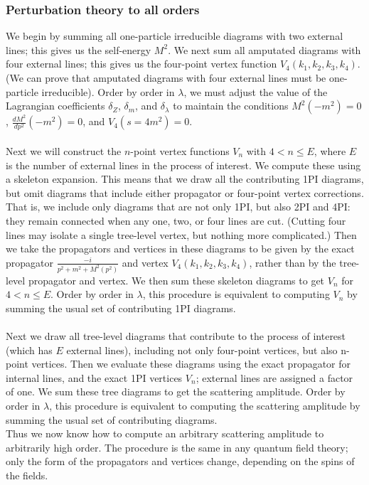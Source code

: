 \subsubsection{Perturbation theory to all orders}
We begin by summing all one-particle irreducible diagrams with two external lines; this gives us the self-energy $M^2$. We next sum all amputated diagrams with four external lines; this gives us the four-point vertex function $V_4(k_1, k_2, k_3, k_4)$. (We can prove that amputated diagrams with four external lines must be one-particle irreducible). Order by order in $\lambda$, we must adjust the value of the Lagrangian coefficients $\delta_Z$, $\delta_m$, and $\delta_{\lambda}$ to maintain the conditions $M^2(-m^2) = 0$, $\frac{dM^2}{dp^2}(-m^2) = 0$, and $V_4(s=4m^2) =0$. 
\\ \\
Next we will construct the $n$-point vertex functions $V_n$ with $4 < n \leq E$, where $E$ is the number of external lines in the process of interest. We compute these using a skeleton expansion. This means that we draw all the contributing 1PI diagrams, but omit diagrams that include either propagator or four-point vertex corrections. That is, we include only diagrams that are not only 1PI, but also 2PI and 4PI: they remain connected when any one, two, or four lines are cut. (Cutting four lines may isolate a single tree-level vertex, but nothing more complicated.) Then we take the propagators and vertices in these diagrams to be given by the exact propagator $\frac{-i}{p^2+m^2+M^2(p^2)}$ and vertex $V_4(k_1,k_2,k_3,k_4)$, rather than by the tree-level propagator and vertex. We then sum these skeleton diagrams to get $V_n$ for $4 < n \leq E$. Order by order in $\lambda$, this procedure is
equivalent to computing $V_n$ by summing the usual set of contributing 1PI diagrams.
\\ \\
Next we draw all tree-level diagrams that contribute to the process of interest (which has $E$ external lines), including not only four-point vertices, but also n-point vertices. Then we evaluate these diagrams using the exact propagator for internal lines, and the exact 1PI vertices $V_n$; external lines are assigned a factor of one. We sum these tree diagrams to get the scattering amplitude. Order by order in $\lambda$, this procedure is equivalent to computing the scattering amplitude by summing the usual set of contributing diagrams.
\\
Thus we now know how to compute an arbitrary scattering amplitude
to arbitrarily high order. The procedure is the same in any quantum field theory; only the form of the propagators and vertices change, depending on the spins of the fields.

